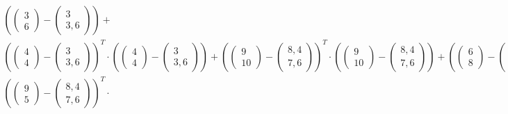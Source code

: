 \documentclass[a4paper,parskip=full-]{article}
\begin{document}
\begin{multline*}
\left( \begin{pmatrix} 3 \\ 6 \end{pmatrix} - \begin{pmatrix} 3 \\ 3,6 \end{pmatrix} \right) + \\
\left( \begin{pmatrix} 4 \\ 4 \end{pmatrix} - \begin{pmatrix} 3 \\ 3,6 \end{pmatrix} \right)^T \cdot
\left( \begin{pmatrix} 4 \\ 4 \end{pmatrix} - \begin{pmatrix} 3 \\ 3,6 \end{pmatrix} \right) + 
\left( \begin{pmatrix}  9 \\ 10 \end{pmatrix} - \begin{pmatrix} 8,4 \\ 7,6 \end{pmatrix} \right)^T \cdot
\left( \begin{pmatrix}  9 \\ 10 \end{pmatrix} - \begin{pmatrix} 8,4 \\ 7,6 \end{pmatrix} \right) +
\left( \begin{pmatrix}  6 \\  8 \end{pmatrix} - \begin{pmatrix} 8,4 \\ 7,6 \end{pmatrix} \right)^T \cdot
\left( \begin{pmatrix}  6 \\  8 \end{pmatrix} - \begin{pmatrix} 8,4 \\ 7,6 \end{pmatrix} \right) + \\
\left( \begin{pmatrix}  9 \\  5 \end{pmatrix} - \begin{pmatrix} 8,4 \\ 7,6 \end{pmatrix} \right)^T \cdot

\end{multline*}
\end{document}
